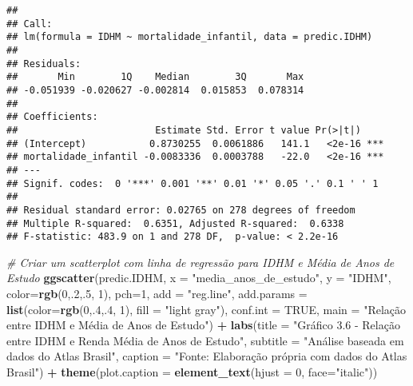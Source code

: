 \documentclass[
]{article}
\newenvironment{Shaded}{\begin{snugshade}}{\end{snugshade}}
\newcommand{\AttributeTok}[1]{\textcolor[rgb]{0.13,0.29,0.53}{#1}}
\newcommand{\CommentTok}[1]{\textcolor[rgb]{0.56,0.35,0.01}{\textit{#1}}}
\newcommand{\ConstantTok}[1]{\textcolor[rgb]{0.56,0.35,0.01}{#1}}
\newcommand{\DecValTok}[1]{\textcolor[rgb]{0.00,0.00,0.81}{#1}}
\newcommand{\FunctionTok}[1]{\textcolor[rgb]{0.13,0.29,0.53}{\textbf{#1}}}
\newcommand{\NormalTok}[1]{#1}
\newcommand{\SpecialCharTok}[1]{\textcolor[rgb]{0.81,0.36,0.00}{\textbf{#1}}}
\newcommand{\StringTok}[1]{\textcolor[rgb]{0.31,0.60,0.02}{#1}}
\begin{document}
\begin{verbatim}
## 
## Call:
## lm(formula = IDHM ~ mortalidade_infantil, data = predic.IDHM)
## 
## Residuals:
##       Min        1Q    Median        3Q       Max 
## -0.051939 -0.020627 -0.002814  0.015853  0.078314 
## 
## Coefficients:
##                        Estimate Std. Error t value Pr(>|t|)    
## (Intercept)           0.8730255  0.0061886   141.1   <2e-16 ***
## mortalidade_infantil -0.0083336  0.0003788   -22.0   <2e-16 ***
## ---
## Signif. codes:  0 '***' 0.001 '**' 0.01 '*' 0.05 '.' 0.1 ' ' 1
## 
## Residual standard error: 0.02765 on 278 degrees of freedom
## Multiple R-squared:  0.6351, Adjusted R-squared:  0.6338 
## F-statistic: 483.9 on 1 and 278 DF,  p-value: < 2.2e-16
\end{verbatim}

\begin{Shaded}
\begin{Highlighting}[]
\CommentTok{\# Criar um scatterplot com linha de regressão para IDHM e Média de Anos de Estudo}
\FunctionTok{ggscatter}\NormalTok{(predic.IDHM, }\AttributeTok{x =} \StringTok{"media\_anos\_de\_estudo"}\NormalTok{, }\AttributeTok{y =} \StringTok{"IDHM"}\NormalTok{, }
          \AttributeTok{color=}\FunctionTok{rgb}\NormalTok{(}\DecValTok{0}\NormalTok{,.}\DecValTok{2}\NormalTok{,.}\DecValTok{5}\NormalTok{,  }\DecValTok{1}\NormalTok{), }\AttributeTok{pch=}\DecValTok{1}\NormalTok{, }\AttributeTok{add =} \StringTok{"reg.line"}\NormalTok{, }
          \AttributeTok{add.params =} \FunctionTok{list}\NormalTok{(}\AttributeTok{color=}\FunctionTok{rgb}\NormalTok{(}\DecValTok{0}\NormalTok{,.}\DecValTok{4}\NormalTok{,.}\DecValTok{4}\NormalTok{,  }\DecValTok{1}\NormalTok{), }\AttributeTok{fill =} \StringTok{"light gray"}\NormalTok{), }
          \AttributeTok{conf.int =} \ConstantTok{TRUE}\NormalTok{, }\AttributeTok{main =} \StringTok{"Relação entre IDHM e Média de Anos de Estudo"}\NormalTok{) }\SpecialCharTok{+}
  \FunctionTok{labs}\NormalTok{(}\AttributeTok{title =} \StringTok{"Gráfico 3.6 {-} Relação entre IDHM e Renda Média de Anos de Estudo"}\NormalTok{,}
       \AttributeTok{subtitle =} \StringTok{"Análise baseada em dados do Atlas Brasil"}\NormalTok{,}
       \AttributeTok{caption =} \StringTok{"Fonte: Elaboração própria com dados do Atlas Brasil"}\NormalTok{) }\SpecialCharTok{+}
  \FunctionTok{theme}\NormalTok{(}\AttributeTok{plot.caption =} \FunctionTok{element\_text}\NormalTok{(}\AttributeTok{hjust =} \DecValTok{0}\NormalTok{, }\AttributeTok{face=}\StringTok{"italic"}\NormalTok{))}
\end{Highlighting}
\end{Shaded}
\end{document}
